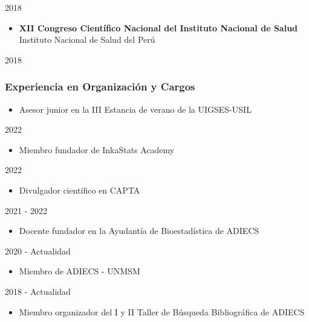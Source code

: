 \documentclass[
  letterpaper,
  DIV=11,
  numbers=noendperiod]{scrartcl}
\providecommand{\tightlist}{%
  \setlength{\itemsep}{0pt}\setlength{\parskip}{0pt}}\usepackage{longtable,booktabs,array}
\begin{document}
2018

\begin{itemize}
\tightlist
\item
  \textbf{XII Congreso Científico Nacional del Instituto Nacional de
  Salud}\\
  Instituto Nacional de Salud del Perú
\end{itemize}

2018

\hypertarget{experiencia-en-organizaciuxf3n-y-cargos}{%
\subsubsection{Experiencia en Organización y
Cargos}\label{experiencia-en-organizaciuxf3n-y-cargos}}

\begin{itemize}
\tightlist
\item
  Asesor junior en la III Estancia de verano de la UIGSES-USIL
\end{itemize}

2022

\begin{itemize}
\tightlist
\item
  Miembro fundador de InkaStats Academy
\end{itemize}

2022

\begin{itemize}
\tightlist
\item
  Divulgador científico en CAPTA
\end{itemize}

2021 - 2022

\begin{itemize}
\tightlist
\item
  Docente fundador en la Ayudantía de Bioestadística de ADIECS
\end{itemize}

2020 - Actualidad

\begin{itemize}
\tightlist
\item
  Miembro de ADIECS - UNMSM
\end{itemize}

2018 - Actualidad

\begin{itemize}
\tightlist
\item
  Miembro organizador del I y II Taller de Búsqueda Bibliográfica de
  ADIECS
\end{itemize}
\end{document}
